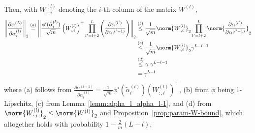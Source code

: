 Then, with $W^{(l)}_{:,i}$ denoting the $i$-th column of the matrix $W^{(l)}$, %
\begin{equation}
\label{eq:aux_alpha_alpha}    
\begin{aligned}
    \left\|  \frac{\partial \alpha^{(L)}}{\partial \alpha_i^{(l)}}\right\|_2\overset{(a)}{=} \left\|\frac{\phi'(\tilde{\alpha}_i^{(l)})}{\sqrt{m}}  \left(W_{:,i}^{(l)}\right)^\top \prod_{l'=l+2}^L\left(\frac{\partial \alpha^{(l')}}{\partial \alpha^{(l'-1)}}\right)\right\|_2
    &\overset{(b)}{\leq} \frac{1}{\sqrt{m}}\norm{W_{:,i}^{(l)}}_2\prod_{l'=l+2}^L\norm{\frac{\partial \alpha^{(l')}}{\partial \alpha^{(l'-1)}}}_2
    \\
    &\overset{(c)}{\leq} \frac{1}{\sqrt{m}}\norm{W_{:,i}^{(l)}}_2\gamma^{L-l-1}\\
    &\overset{(d)}{\leq} \gamma\;\gamma^{L-l-1}
    \\
    &=\gamma^{L-l}
\end{aligned}
\end{equation}
where (a) follows from $\frac{\partial \alpha^{(l+1)}}{\partial \alpha_i^{(l)}}=\frac{1}{\sqrt{m}}\phi'(\tilde{\alpha}^{(l)}_i)(W^{(l)}_{:,i})^\top$, (b) from $\phi$ being  1-Lipschitz, (c) from Lemma~\ref{lemm:alpha_l_alpha_l-1}, and (d) from $\norm{W^{(l)}_{:,i}}_2\leq \norm{W^{(l)}}_2$ and Proposition~\ref{prop:param-W-bound}, which altogether holds with probability $1-\frac{2}{m}(L-l)$. 

